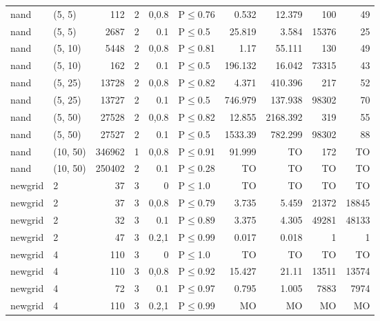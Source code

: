\begin{longtable}{llrrrlrrrr}
 nand          & (5, 5)   &    	112 &   2 & 0,0.8 & P$\leq$0.76  & 0.532    & 12.379   & 100     & 49     \\
 nand          & (5, 5)   &   	2687 &   2 & 0.1   & P$\leq$0.5   & 25.819   & 3.584    & 15376   & 25     \\
 nand          & (5, 10)  &   	5448 &   2 & 0,0.8 & P$\leq$0.81  & 1.17     & 55.111   & 130     & 49     \\
 nand          & (5, 10)  &    	162 &   2 & 0.1   & P$\leq$0.5   & 196.132  & 16.042   & 73315   & 43     \\
 nand          & (5, 25)  &  	13728 &   2 & 0,0.8 & P$\leq$0.82  & 4.371    & 410.396  & 217     & 52     \\
 nand          & (5, 25)  &  	13727 &   2 & 0.1   & P$\leq$0.5   & 746.979  & 137.938  & 98302   & 70     \\
 nand          & (5, 50)  &  	27528 &   2 & 0,0.8 & P$\leq$0.82  & 12.855   & 2168.392 & 319     & 55     \\
 nand          & (5, 50)  &  	27527 &   2 & 0.1   & P$\leq$0.5   & 1533.39  & 782.299  & 98302   & 88     \\
 nand          & (10, 50) & 	346962 &   1 & 0,0.8 & P$\leq$0.91  & 91.999   & TO       & 172     & TO     \\
 nand          & (10, 50) & 	250402 &   2 & 0.1   & P$\leq$0.28  & TO       & TO       & TO      & TO     \\
 newgrid       & 2        &     	37 &   3 & 0     & P$\leq$1.0   & TO       & TO       & TO      & TO     \\
 newgrid       & 2        &     	37 &   3 & 0,0.8 & P$\leq$0.79  & 3.735    & 5.459    & 21372   & 18845  \\
 newgrid       & 2        &     	32 &   3 & 0.1   & P$\leq$0.89  & 3.375    & 4.305    & 49281   & 48133  \\
 newgrid       & 2        &     	47 &   3 & 0.2,1 & P$\leq$0.99  & 0.017    & 0.018    & 1       & 1      \\
 newgrid       & 4        &    	110 &   3 & 0     & P$\leq$1.0   & TO       & TO       & TO      & TO     \\
 newgrid       & 4        &    	110 &   3 & 0,0.8 & P$\leq$0.92  & 15.427   & 21.11    & 13511   & 13574  \\
 newgrid       & 4        &     	72 &   3 & 0.1   & P$\leq$0.97  & 0.795    & 1.005    & 7883    & 7974   \\
 newgrid       & 4        &    	110 &   3 & 0.2,1 & P$\leq$0.99  & MO       & MO       & MO      & MO     \\

\end{longtable}
